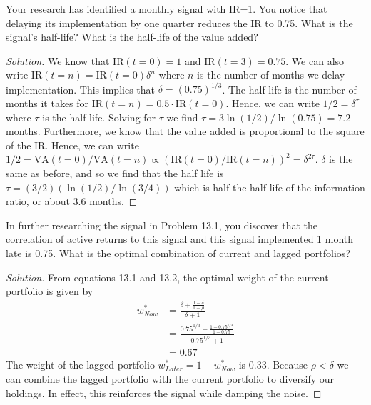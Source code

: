 \begin{problem}{13.1}
  Your research has identified a monthly signal with IR=1. You notice that delaying its implementation by one quarter reduces the IR to 0.75. What is the signal's half-life? What is the half-life of the value added?
\end{problem}

\begin{proof}[Solution]
  We know that $\mathrm{IR}(t=0)=1$ and $\mathrm{IR}(t=3)=0.75$. We can also write $\mathrm{IR}(t=n)=\mathrm{IR}(t=0)\delta^{n}$ where $n$ is the number of months we delay implementation. This implies that $\delta=(0.75)^{1/3}$. The half life is the number of months it takes for $\mathrm{IR}(t=n)=0.5\cdot \mathrm{IR}(t=0)$. Hence, we can write $1/2 = \delta^{\tau}$ where $\tau$ is the half life. Solving for $\tau$ we find $\tau = 3\ln(1/2)/\ln(0.75) = 7.2$ months. Furthermore, we know that the value added is proportional to the square of the IR. Hence, we can write $1/2 = \mathrm{VA}(t=0)/\mathrm{VA}(t=n) \propto (\mathrm{IR}(t=0)/\mathrm{IR}(t=n))^{2}=\delta^{2\tau}$. $\delta$ is the same as before, and so we find that the half life is $\tau=(3/2) (\ln(1/2)/\ln(3/4))$ which is half the half life of the information ratio, or about 3.6 months.  
\end{proof}

\begin{problem}{13.2}
  In further researching the signal in Problem 13.1, you discover that the correlation of active returns to this signal and this signal implemented 1 month late is 0.75. What is the optimal combination of current and lagged portfolios?
\end{problem}

\begin{proof}[Solution]
  From equations 13.1 and 13.2, the optimal weight of the current portfolio is given by
  \begin{align*}
   w_{Now}^{*} 
	       &= \frac{\delta+\frac{1-\delta}{1-\rho}}{\delta+1}\\
	       &= \frac{0.75^{1/3}+\frac{1-0.75^{1/3}}{1-0.75}}{0.75^{1/3}+1}\\
	       &= 0.67
  \end{align*}
  The weight of the lagged portfolio $w_{Later}^{*}=1-w_{Now}^{*}$ is 0.33. Because $\rho < \delta$ we can combine the lagged portfolio with the current portfolio to diversify our holdings. In effect, this reinforces the signal while damping the noise.

\end{proof}

